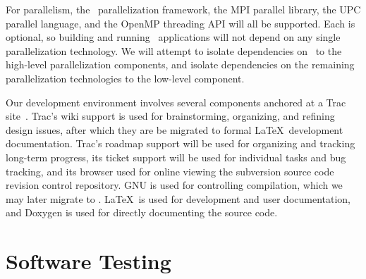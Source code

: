 \documentclass[11pt,letterpaper]{article}
\begin{document}
For parallelism, the \charm\ parallelization framework, the MPI
parallel library, the UPC parallel language, and the OpenMP threading
API will all be supported.  Each is optional, so building and running
\cello\ applications will not depend on any single parallelization
technology.  We will attempt to isolate dependencies on \charm\ to the
high-level parallelization components, and isolate dependencies on the
remaining parallelization technologies to the low-level
 component.

Our development environment involves several components anchored at a
Trac site~\cite{wwwtrac}.
Trac's wiki support is used for brainstorming, organizing, and
refining design issues, after which they are be migrated to formal
\LaTeX\ development documentation.  Trac's roadmap support will be
used for organizing and tracking long-term progress, its ticket
support will be used for individual tasks and bug tracking, and its
browser used for online viewing the subversion source code revision
control repository.  GNU  is used for controlling
compilation, which we may later migrate to .  \LaTeX\ is
used for development and user documentation, and Doxygen is used for
directly documenting the source code.


\section{Software Testing} \label{s:testing}


\end{document}
